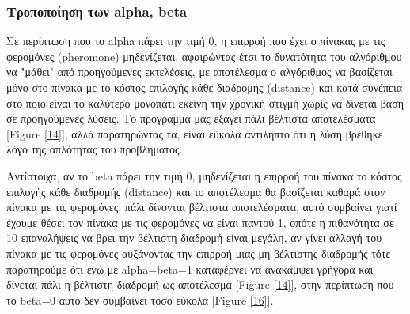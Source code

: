 \subsubsection{Τροποποίηση των alpha, beta}

Σε περίπτωση που το alpha πάρει την τιμή 0, η επιρροή που έχει ο πίνακας με τις φερομόνες (pheromone) μηδενίζεται, αφαιρώντας έτσι το δυνατότητα του αλγόριθμου να "μάθει" από προηγούμενες εκτελέσεις, με αποτέλεσμα ο αλγόριθμος να βασίζεται μόνο στο πίνακα με το κόστος επιλογής κάθε διαδρομής (distance) και κατά συνέπεια στο ποιο είναι το καλύτερο μονοπάτι εκείνη την χρονική στιγμή χωρίς να δίνεται βάση σε προηγούμενες λύσεις. Το πρόγραμμα μας εξάγει πάλι βέλτιστα αποτελέσματα [Figure \ref{14}], αλλά παρατηρώντας τα, είναι εύκολα αντιληπτό ότι η λύση βρέθηκε λόγο της απλότητας του προβλήματος. 

Αντίστοιχα, αν το beta πάρει την τιμή 0, μηδενίζεται η επιρροή του πίνακα το κόστος επιλογής κάθε διαδρομής (distance) και το αποτέλεσμα θα βασίζεται καθαρά στον πίνακα με τις φερομόνες, πάλι δίνονται βέλτιστα αποτελέσματα, αυτό συμβαίνει γιατί έχουμε θέσει τον πίνακα με τις φερομόνες να είναι παντού 1, οπότε η πιθανότητα σε 10 επαναλήψεις να βρει την βέλτιστη διαδρομή είναι μεγάλη, αν γίνει αλλαγή του πίνακα με τις φερομόνες αυξάνοντας την επιρροή μιας μη βέλτιστης διαδρομής τότε παρατηρούμε ότι ενώ με alpha=beta=1 καταφέρνει να ανακάμψει γρήγορα και δίνεται πάλι η βέλτιστη διαδρομή ως αποτέλεσμα [Figure \ref{14}], στην περίπτωση που το beta=0 αυτό δεν συμβαίνει τόσο εύκολα [Figure \ref{16}].

